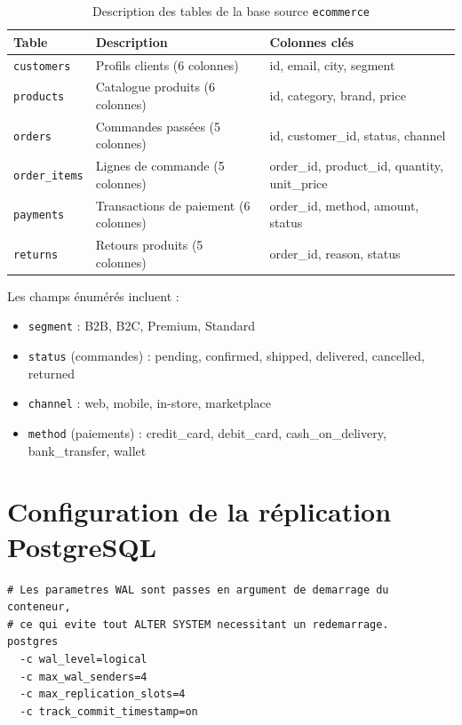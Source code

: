 \documentclass[12pt,a4paper]{report}
\begin{document}
\begin{table}[h]
\centering
\caption{Description des tables de la base source \texttt{ecommerce}}
\label{tab:schema}
\renewcommand{\arraystretch}{1.3}
\begin{tabularx}{\linewidth}{lXl}
\toprule
\textbf{Table} & \textbf{Description} & \textbf{Colonnes clés} \\
\midrule
\texttt{customers}    & Profils clients (6 colonnes)
    & id, email, city, segment \\
\texttt{products}     & Catalogue produits (6 colonnes)
    & id, category, brand, price \\
\texttt{orders}       & Commandes passées (5 colonnes)
    & id, customer\_id, status, channel \\
\texttt{order\_items} & Lignes de commande (5 colonnes)
    & order\_id, product\_id, quantity, unit\_price \\
\texttt{payments}     & Transactions de paiement (6 colonnes)
    & order\_id, method, amount, status \\
\texttt{returns}      & Retours produits (5 colonnes)
    & order\_id, reason, status \\
\bottomrule
\end{tabularx}
\end{table}

Les champs énumérés incluent :
\begin{itemize}
    \item \texttt{segment} : B2B, B2C, Premium, Standard
    \item \texttt{status} (commandes) : pending, confirmed, shipped, delivered,
          cancelled, returned
    \item \texttt{channel} : web, mobile, in-store, marketplace
    \item \texttt{method} (paiements) : credit\_card, debit\_card,
          cash\_on\_delivery, bank\_transfer, wallet
\end{itemize}

\section{Configuration de la réplication PostgreSQL}

\begin{lstlisting}[language={},
    caption={Paramètres WAL injectés via docker-compose.yml (commande postgres)}]
# Les parametres WAL sont passes en argument de demarrage du conteneur,
# ce qui evite tout ALTER SYSTEM necessitant un redemarrage.
postgres
  -c wal_level=logical
  -c max_wal_senders=4
  -c max_replication_slots=4
  -c track_commit_timestamp=on
\end{lstlisting}
\end{document}
